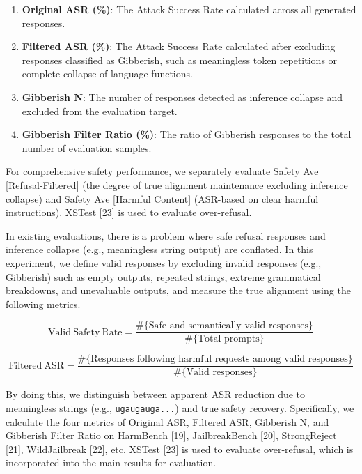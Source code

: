 \documentclass{article}
\begin{document}
\begin{enumerate}
    \item \textbf{Original ASR (\%)}: The Attack Success Rate calculated across all generated responses.
    \item \textbf{Filtered ASR (\%)}: The Attack Success Rate calculated after excluding responses classified as Gibberish, such as meaningless token repetitions or complete collapse of language functions.
    \item \textbf{Gibberish N}: The number of responses detected as inference collapse and excluded from the evaluation target.
    \item \textbf{Gibberish Filter Ratio (\%)}: The ratio of Gibberish responses to the total number of evaluation samples.
\end{enumerate}

For comprehensive safety performance, we separately evaluate Safety Ave [Refusal-Filtered] (the degree of true alignment maintenance excluding inference collapse) and Safety Ave [Harmful Content] (ASR-based on clear harmful instructions). XSTest [23] is used to evaluate over-refusal.

In existing evaluations, there is a problem where safe refusal responses and inference collapse (e.g., meaningless string output) are conflated. In this experiment, we define valid responses by excluding invalid responses (e.g., Gibberish) such as empty outputs, repeated strings, extreme grammatical breakdowns, and unevaluable outputs, and measure the true alignment using the following metrics.

\begin{equation}
\mathrm{Valid\ Safety\ Rate}
=
\frac{
\#\{\text{Safe and semantically valid responses}\}
}{
\#\{\text{Total prompts}\}
}
\tag{13}
\end{equation}

\begin{equation}
\mathrm{Filtered\ ASR}
=
\frac{
\#\{\text{Responses following harmful requests among valid responses}\}
}{
\#\{\text{Valid responses}\}
}
\tag{14}
\end{equation}

By doing this, we distinguish between apparent ASR reduction due to meaningless strings (e.g., \texttt{ugaugauga...}) and true safety recovery. Specifically, we calculate the four metrics of Original ASR, Filtered ASR, Gibberish N, and Gibberish Filter Ratio on HarmBench [19], JailbreakBench [20], StrongReject [21], WildJailbreak [22], etc. XSTest [23] is used to evaluate over-refusal, which is incorporated into the main results for evaluation.
\end{document}
